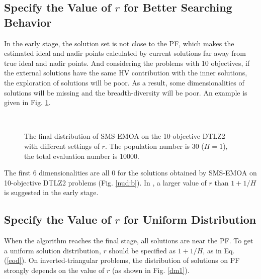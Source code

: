 \documentclass[conference]{IEEEtran}
\begin{document}
\subsection{Specify the Value of $r$ for Better Searching Behavior}
In the early stage, the solution set is not close to the PF, which makes the 
estimated ideal and nadir points calculated by current solutions 
far away from true ideal and nadir points. 
And considering the problems with 10 objectives, 
if the external solutions have the same HV contribution with the inner solutions, 
the exploration of solutions will be poor. 
As a result, some dimensionalities of solutions will be missing and the breadth-diversity\cite{DtA} will be poor. 
An example is given in Fig. \ref{nud}. 
\begin{figure}[!t]
  \centering
  \quad
  \\
  \caption{
    The final distribution of SMS-EMOA on the 10-objective DTLZ2 with different settings of $r$. 
    The population number is 30 ($H=1$), the total evaluation number is 10000.
  }
  \label{nud}
\end{figure} 
The first 6 dimensionalities are all 0 for the solutions obtained by SMS-EMOA on 10-objective DTLZ2 problems (Fig. \ref{nud:b}). 
In \cite{hisao:dynamic}, a larger value of $r$ than $1+1/H$ is suggested in the early stage. 

\subsection{Specify the Value of $r$ for Uniform Distribution}
When the algorithm reaches the final stage, all solutions are near the PF. 
To get a uniform solution distribution, $r$ should be specified as $1+1/H$, as in Eq. (\ref{eod}). 
On inverted-triangular problems, the distribution of solutions on PF
strongly depends on the value of $r$ (as shown in Fig. \ref{dm1}). 
\end{document}
